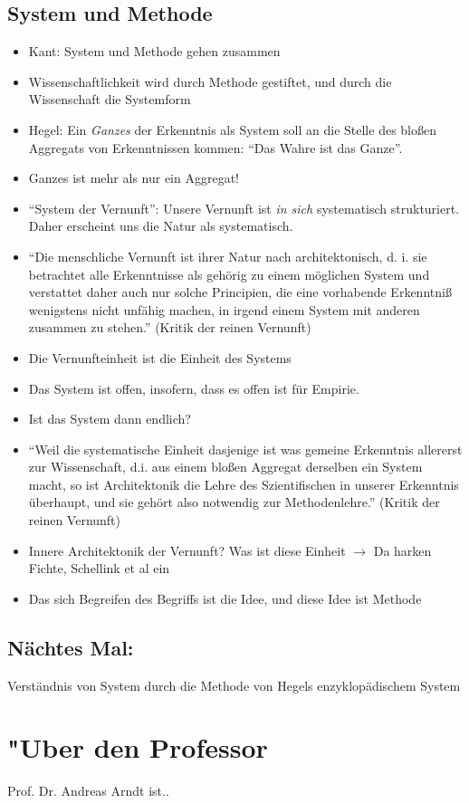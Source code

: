\documentclass[emulatestandardclasses]{scrartcl}
\begin{document}
\subsection{System und Methode}

\begin{itemize}
  \item Kant: System und Methode gehen zusammen
  \item Wissenschaftlichkeit wird durch Methode gestiftet, und durch die Wissenschaft die Systemform
  \item Hegel: Ein \emph{Ganzes} der Erkenntnis als System soll an die Stelle des bloßen Aggregats von Erkenntnissen kommen: "`Das Wahre ist das Ganze"'.
  \item Ganzes ist mehr als nur ein Aggregat!
  \item "`System der Vernunft"': Unsere Vernunft ist \emph{in sich} systematisch strukturiert. Daher erscheint uns die Natur als systematisch.
  \item "`Die menschliche Vernunft ist ihrer Natur nach architektonisch, d. i. sie	 betrachtet alle Erkenntnisse als gehörig zu einem möglichen System und	 verstattet daher auch nur solche Principien, die eine vorhabende Erkenntniß wenigstens nicht unfähig machen, in irgend einem System mit anderen	zusammen zu stehen."' (Kritik der reinen Vernunft)
  \item Die Vernunfteinheit ist die Einheit des Systems
  \item Das System ist offen, insofern, dass es offen ist für Empirie.
  \item Ist das System dann endlich?
  \item "`Weil die systematische Einheit dasjenige ist was gemeine Erkenntnis allererst zur Wissenschaft, d.i. aus einem bloßen Aggregat derselben ein System macht, so ist Architektonik die Lehre des Szientifischen in unserer Erkenntnis überhaupt, und sie gehört also notwendig zur Methodenlehre."' (Kritik der reinen Vernunft)
  \item Innere Architektonik der Vernunft? Was ist diese Einheit $\rightarrow$ Da harken Fichte, Schellink et al ein
  \item Das sich Begreifen des Begriffs ist die Idee, und diese Idee ist Methode
\end{itemize}

\subsection{Nächtes Mal:
}
Verständnis von System durch die Methode von Hegels enzyklopädischem System

\newpage
\section{"Uber den Professor}
Prof. Dr. Andreas Arndt ist..


\end{document}
